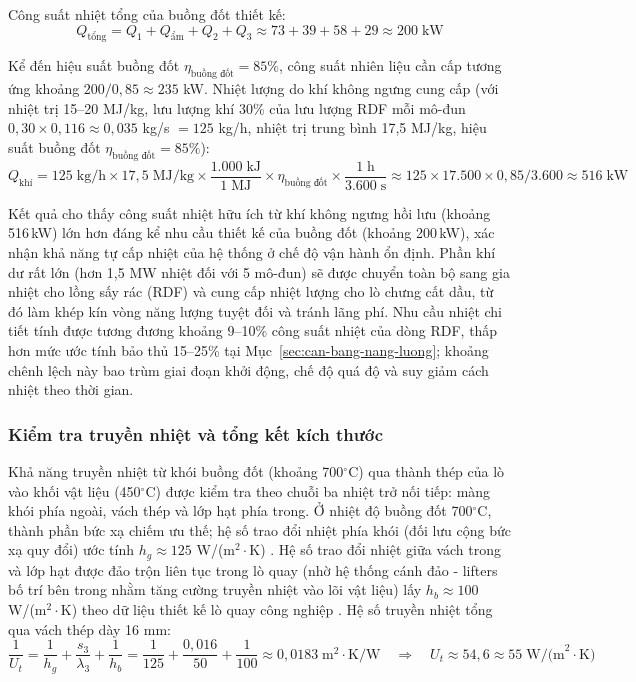 \documentclass[../main.tex]{subfiles}
\begin{document}
Công suất nhiệt tổng của buồng đốt thiết kế:
\begin{equation}
Q_{\text{tổng}} = Q_1 + Q_{\text{ẩm}} + Q_2 + Q_3 \approx 73 + 39 + 58 + 29 \approx 200\;\text{kW}
\end{equation}

Kể đến hiệu suất buồng đốt $\eta_{\text{buồng đốt}} = 85\%$, công suất nhiên liệu cần cấp tương ứng khoảng $200/0{,}85 \approx 235$ kW. Nhiệt lượng do khí không ngưng cung cấp (với nhiệt trị 15--20 MJ/kg, lưu lượng khí 30\% của lưu lượng RDF mỗi mô-đun $0{,}30 \times 0{,}116 \approx 0{,}035$ kg/s $= 125$ kg/h, nhiệt trị trung bình 17,5 MJ/kg, hiệu suất buồng đốt $\eta_{\text{buồng đốt}} = 85\%$):
\begin{equation}
Q_{\text{khí}} = 125\;\text{kg/h} \times 17{,}5\;\text{MJ/kg}
\times \frac{1.000\;\text{kJ}}{1\;\text{MJ}} \times \eta_{\text{buồng đốt}}
\times \frac{1\;\text{h}}{3.600\;\text{s}}
\approx 125 \times 17.500 \times 0{,}85 / 3.600 \approx 516\;\text{kW}
\label{eq:Qkhi}
\end{equation}

Kết quả cho thấy công suất nhiệt hữu ích từ khí không ngưng hồi lưu (khoảng 516\,kW) lớn hơn đáng kể nhu cầu thiết kế của buồng đốt (khoảng 200\,kW), xác nhận khả năng tự cấp nhiệt của hệ thống ở chế độ vận hành ổn định. Phần khí dư rất lớn (hơn 1,5 MW nhiệt đối với 5 mô-đun) sẽ được chuyển toàn bộ sang gia nhiệt cho lồng sấy rác (RDF) và cung cấp nhiệt lượng cho lò chưng cất dầu, từ đó làm khép kín vòng năng lượng tuyệt đối và tránh lãng phí. Nhu cầu nhiệt chi tiết tính được tương đương khoảng 9--10\% công suất nhiệt của dòng RDF, thấp hơn mức ước tính bảo thủ 15--25\% tại Mục~\ref{sec:can-bang-nang-luong}; khoảng chênh lệch này bao trùm giai đoạn khởi động, chế độ quá độ và suy giảm cách nhiệt theo thời gian.

\subsubsection{Kiểm tra truyền nhiệt và tổng kết kích thước}

Khả năng truyền nhiệt từ khói buồng đốt (khoảng 700$^\circ\mathrm{C}$) qua thành thép của lò vào khối vật liệu (450$^\circ\mathrm{C}$) được kiểm tra theo chuỗi ba nhiệt trở nối tiếp: màng khói phía ngoài, vách thép và lớp hạt phía trong. Ở nhiệt độ buồng đốt 700$^\circ\mathrm{C}$, thành phần bức xạ chiếm ưu thế; hệ số trao đổi nhiệt phía khói (đối lưu cộng bức xạ quy đổi) ước tính $h_g \approx 125$ W/(m$^2\cdot$K) \cite{Incropera2011}. Hệ số trao đổi nhiệt giữa vách trong và lớp hạt được đảo trộn liên tục trong lò quay (nhờ hệ thống cánh đảo - lifters bố trí bên trong nhằm tăng cường truyền nhiệt vào lõi vật liệu) lấy $h_b \approx 100$ W/(m$^2\cdot$K) theo dữ liệu thiết kế lò quay công nghiệp \cite{Boateng2008}. Hệ số truyền nhiệt tổng qua vách thép dày 16 mm:
\begin{equation}
\frac{1}{U_t} = \frac{1}{h_g} + \frac{s_3}{\lambda_3} + \frac{1}{h_b}
= \frac{1}{125} + \frac{0{,}016}{50} + \frac{1}{100}
\approx 0{,}0183\;\text{m}^2\!\cdot\!\text{K/W}
\quad\Rightarrow\quad
U_t \approx 54{,}6 \approx 55\;\text{W/(m}^2\!\cdot\!\text{K)}
\end{equation}
\end{document}
